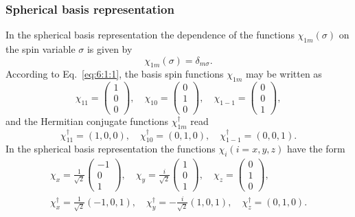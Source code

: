 \subsubsection{Spherical basis representation}
In the spherical basis representation the dependence of the functions $\chi_{1 m}(\sigma)$ on the spin variable $\sigma$ is given by
\begin{equation}
\chi_{1 m}(\sigma)=\delta_{m \sigma} . \label{eq:6:3:5}
\end{equation}
According to Eq.~\eqref{eq:6:1:1}, the basis spin functions $\chi_{1 m}$ may be written as
\begin{equation}
\chi_{11}=\begin{pmatrix}
1 \\
0 \\
0
\end{pmatrix}, \quad \chi_{10}=\begin{pmatrix}
0 \\
1 \\
0
\end{pmatrix}, \quad \chi_{1-1}=\begin{pmatrix}
0 \\
0 \\
1
\end{pmatrix}, \label{eq:6:3:6}
\end{equation}
and the Hermitian conjugate functions $\chi_{1 m}^{\dagger}$ read
\begin{equation}
\chi_{11}^{\dagger}=(1,0,0), \quad \chi_{10}^{\dagger}=(0,1,0), \quad \chi_{1-1}^{\dagger}=(0,0,1) . \label{eq:6:3:7}
\end{equation}
In the spherical basis representation the functions $\chi_{i}(i=x, y, z)$ have the form
\begin{gather}
\chi_{x}=\frac{1}{\sqrt{2}}\begin{pmatrix}
-1 \\
0 \\
1
\end{pmatrix}, \quad \chi_{y}=\frac{i}{\sqrt{2}}\begin{pmatrix}
1 \\
0 \\
1
\end{pmatrix}, \quad \chi_{z}=\begin{pmatrix}
0 \\
1 \\
0
\end{pmatrix}, \label{eq:6:3:8}\\
\chi_{x}^{\dagger}=\frac{1}{\sqrt{2}}(-1,0,1), \quad \chi_{y}^{\dagger}=-\frac{i}{\sqrt{2}}(1,0,1), \quad \chi_{z}^{\dagger}=(0,1,0) . \label{eq:6:3:9}
\end{gather}
